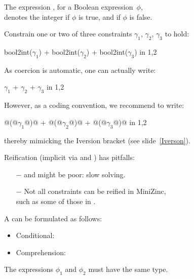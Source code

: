 \documentclass{cons-beamer}
\begin{document}
\begin{flashcardminizinc}
\begin{frame}[fragile] %
  The expression , for a Boolean
  expression~$\phi$, \\ denotes the integer  if $\phi$ is
  true, and  if $\phi$ is false. \vfill
  \begin{example}
    Constrain one \alert{or} two of three constraints $\gamma_1$,
    $\gamma_2$, $\gamma_3$ to hold: 
    \small
    \begin{mznno}
  bool2int($\gamma_1$) + bool2int($\gamma_2$) + bool2int($\gamma_3$) in {1,2}
    \end{mznno}\normalsize
    As  coercion is automatic, one can actually
    write: \small
    \begin{mznno}
       $\gamma_1$   +  $\gamma_2$    +  $\gamma_3$    in {1,2}
    \end{mznno}\normalsize
    However, as a coding convention, we recommend to write:
    \small
    \begin{mznno}
      @(@$\gamma_1$@)@ + @(@$\gamma_2$@)@ + @(@$\gamma_3$@)@ in {1,2}
    \end{mznno}\normalsize
    thereby mimicking the Iversion bracket (see slide~\ref{Iverson}).
  \end{example}\vfill
  \alert{Reification (implicit via  and
    ) has pitfalls:} \vfill
  \begin{itemize}
  \item[$-$]  and  might
    be \alert{poor}: slow solving. \vfill
  \item[$-$] \alert{Not} all constraints can be reified in MiniZinc, \\
    such as some of those in \topicConsPredicates.
  \end{itemize}
\end{frame}

\begin{frame}[fragile]\label{varTest}
  A  can be formulated as follows:
  \begin{itemize}
  \item Conditional: 
  \item Comprehension: 
  \end{itemize}
  The expressions $\phi_1$ and $\phi_2$ must have the same type.
  \vfill


\end{frame}
\end{flashcardminizinc}
\end{document}

